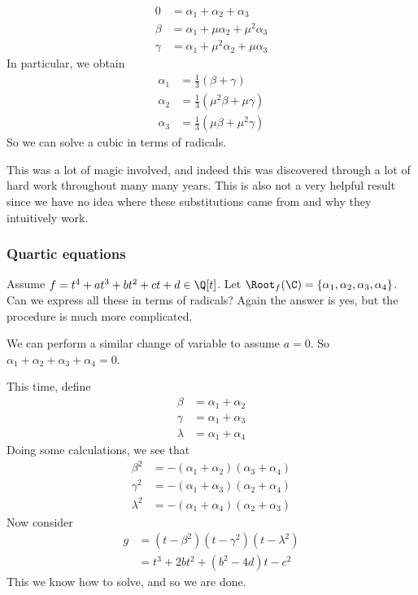 \documentclass[a4paper]{article}
\begin{document}
\begin{align*}
  0 &= \alpha_1 + \alpha_2 + \alpha_3\\
  \beta &= \alpha_1 + \mu \alpha_2 + \mu^2 \alpha_3\\
  \gamma &= \alpha_1 + \mu^2 \alpha_2 + \mu \alpha_3
\end{align*}
In particular, we obtain
\begin{align*}
  \alpha_1 &= \frac{1}{3}(\beta + \gamma)\\
  \alpha_2 &= \frac{1}{3}(\mu^2 \beta + \mu \gamma)\\
  \alpha_3 &= \frac{1}{3}(\mu \beta + \mu^2 \gamma)
\end{align*}
So we can solve a cubic in terms of radicals.

This was a lot of magic involved, and indeed this was discovered through a lot of hard work throughout many many years. This is also not a very helpful result since we have no idea where these substitutions came from and why they intuitively work.

\subsubsection*{Quartic equations}
Assume $f = t^4 + at^3 + bt^2 + ct + d\in \Q[t]$. Let $\Root_f(\C) = \{\alpha_1, \alpha_2, \alpha_3, \alpha_4\}$. Can we express all these in terms of radicals? Again the answer is yes, but the procedure is much more complicated.

We can perform a similar change of variable to assume $a = 0$. So $\alpha_1 + \alpha_2 + \alpha_3 + \alpha_4 = 0$.

This time, define
\begin{align*}
  \beta &= \alpha_1 + \alpha_2\\
  \gamma &= \alpha_1 + \alpha_3\\
  \lambda &= \alpha_1 + \alpha_4
\end{align*}
Doing some calculations, we see that
\begin{align*}
  \beta^2 &= -(\alpha_1 + \alpha_2)(\alpha_3 + \alpha_4)\\
  \gamma^2 &= -(\alpha_1 + \alpha_3)(\alpha_2 + \alpha_4)\\
  \lambda^2 &= -(\alpha_1 + \alpha_4)(\alpha_2 + \alpha_3)
\end{align*}
Now consider
\begin{align*}
  g &= (t - \beta^2)(t - \gamma^2)(t - \lambda^2)\\
  &= t^3 + 2bt^2 + (b^2 - 4d)t - c^2
\end{align*}
This we know how to solve, and so we are done.
\end{document}
